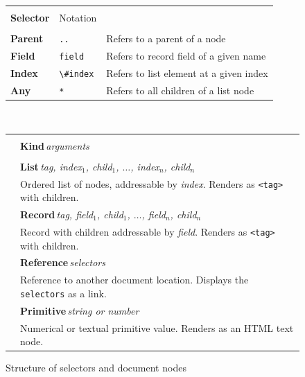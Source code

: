 \documentclass[sigconf]{acmart}
\begin{document}
\begin{figure}
\newcommand{\seltablecol}[3]{
\sffamily\small{\bfseries #2} & {\footnotesize #1} & \footnotesize #3\\
}
\newcommand{\ndtablecol}[4]{
\raisebox{-0.2em}{#1} & \sffamily\small{\bfseries #2}\,\;\textit{\footnotesize #3}\\[-0.2em]
&\sffamily\footnotesize #4\\[0.3em]
}

\begin{tabular}{|llp{18.08em}|}
\hline
\rowcolor{ekgray}
&&\\[-1em]
\rowcolor{ekgray}
\sffamily\small{\bfseries Selector} & {\sffamily\footnotesize Notation} & \\[0.2em]
\hline
&&\\[-1em]
\seltablecol{\Verb|..|}{Parent}{Refers to a parent of a node}
\seltablecol{\Verb|field|}{Field}{Refers to record field of a given name}
\seltablecol{\Verb|\#index|}{Index}{Refers to list element at a given index}
\seltablecol{\Verb|*|}{Any}{Refers to all children of a list node}
\hline
\end{tabular}

~\\[0.5em]

\begin{tabular}{|cl|}
\hline
\rowcolor{ekgray}
&\\[-1em]
\rowcolor{ekgray}
& \sffamily\small{\bfseries Kind}\;\,\textit{\footnotesize arguments} \\[0.2em]
\hline
&\\[-1em]
\ndtablecol{\faListUl}{List}{tag, index$_1$, child$_1$, $\ldots$, index$_n$, child$_n$}
  {Ordered list of nodes, addressable by \textit{index}. Renders as \Verb|<tag>| with children.}
\ndtablecol{\faFileO}{Record}{tag, field$_1$, child$_1$, $\ldots$, field$_n$, child$_n$}
  {Record with children addressable by \textit{field}. Renders as \Verb|<tag>| with children.}
\ndtablecol{\faExternalLink}{Reference}{selectors}
  {Reference to another document location. Displays the \Verb|selectors| as a link.}
\ndtablecol{\faFont}{Primitive}{string \textnormal{or} number}
  {Numerical or textual primitive value. Renders as an HTML text node.}
\hline
\end{tabular}
\caption{Structure of selectors and document nodes}
\label{fig:doc}
\end{figure}

\end{document}
